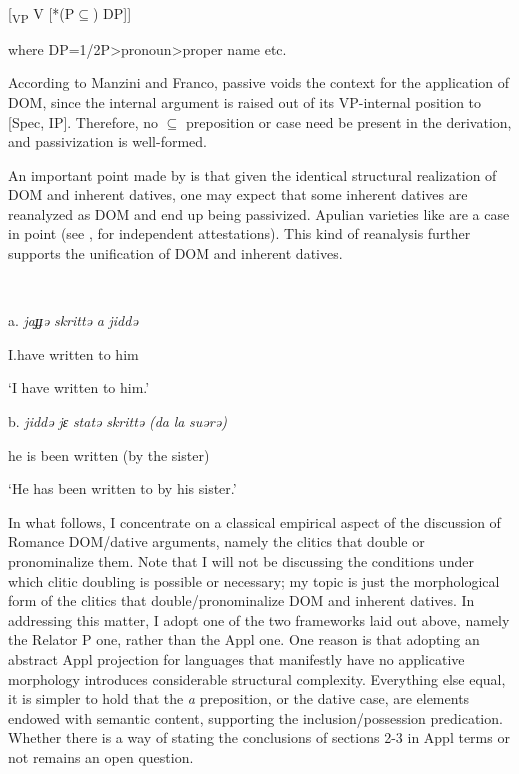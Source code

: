 \documentclass[output=paper]{langscibook}
\begin{document}
\ea\label{ex:key:}
{} \\
\z

[\textsubscript{VP} V   [*(P${\subseteq}$) DP]]    


where DP=1/2P>pronoun>proper name etc.

According to Manzini and Franco, passive voids the context for the application of DOM, since the internal argument is raised out of its VP-internal position to [Spec, IP]. Therefore, no ${\subseteq}$ preposition or case need be present in the derivation, and passivization is well-formed.  

An important point made by \citet{Pineda2016} is that given the identical structural realization of DOM and inherent datives, one may expect that some inherent datives are reanalyzed as DOM and end up being passivized. Apulian varieties like  are a case in point (see \citealt{Loporcaro1988}, \citealt{Ledgeway2000} for independent attestations). This kind of reanalysis further supports the unification of DOM and inherent datives.  

\ea\label{ex:key:}
{}\\
\z

a.  \textit{jaɟɟə}   \textit{skrittə}   \textit{a} \textit{jiddə}



  I.have  written  to him


  ‘I have written to him.’


  b.  \textit{jiddə}   \textit{jɛ}   \textit{statə}   \textit{skrittə}   \textit{(da} \textit{la} \textit{suərə)}



  he  is  been   written (by the sister)



  ‘He has been written to by his sister.’


In what follows, I concentrate on a classical empirical aspect of the discussion of Romance DOM/dative arguments, namely the clitics that double or pronominalize them. Note that I will not be discussing the conditions under which clitic doubling is possible or necessary; my topic is just the morphological form of the clitics that double/pronominalize DOM and inherent datives. In addressing this matter, I adopt one of the two frameworks laid out above, namely the Relator P one, rather than the Appl one. One reason is that adopting an abstract Appl projection for languages that manifestly have no applicative morphology introduces considerable structural complexity. Everything else equal, it is simpler to hold that the \textit{a} preposition, or the dative case, are elements endowed with semantic content, supporting the inclusion/possession predication. Whether there is a way of stating the conclusions of sections 2-3 in Appl terms or not remains an open question.
\end{document}
